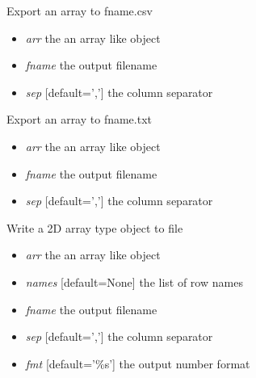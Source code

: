 \documentclass[a4paper,11pt,english]{sphinxmanual}
\begin{document}

\begin{fulllineitems}
\label{modules_doc:cbmpy.CBTools.exportArray2CSV}
Export an array to fname.csv
\begin{itemize}
\item {} 
\emph{arr} the an array like object

\item {} 
\emph{fname} the output filename

\item {} 
\emph{sep} {[}default=','{]} the column separator

\end{itemize}

\end{fulllineitems}


\begin{fulllineitems}
\label{modules_doc:cbmpy.CBTools.exportArray2TXT}
Export an array to fname.txt
\begin{itemize}
\item {} 
\emph{arr} the an array like object

\item {} 
\emph{fname} the output filename

\item {} 
\emph{sep} {[}default=','{]} the column separator

\end{itemize}

\end{fulllineitems}


\begin{fulllineitems}
\label{modules_doc:cbmpy.CBTools.exportLabelledArray}
Write a 2D array type object to file
\begin{itemize}
\item {} 
\emph{arr} the an array like object

\item {} 
\emph{names} {[}default=None{]} the list of row names

\item {} 
\emph{fname} the output filename

\item {} 
\emph{sep} {[}default=','{]} the column separator

\item {} 
\emph{fmt} {[}default='\%s'{]} the output number format

\end{itemize}

\end{fulllineitems}
\end{document}
